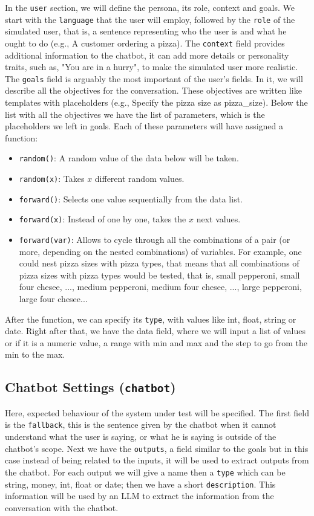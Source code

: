 In the \texttt{user} section, we will define
the persona, its role, context and goals.
We start with the \texttt{language} that the user will employ,
followed by the \texttt{role} of the simulated user,
that is, a sentence representing who the user is
and what he ought to do (e.g., A customer ordering a pizza).
The \texttt{context} field provides additional information to the chatbot,
it can add more details or personality traits, such as,
"You are in a hurry", to make the simulated user more realistic.
The \texttt{goals} field is arguably the most important of the user's fields.
In it, we will describe all the objectives for the conversation.
These objectives are written like templates with placeholders
(e.g., Specify the pizza size as {{pizza\_size}}).
Below the list with all the objectives
we have the list of parameters, which is the placeholders we left in goals.
Each of these parameters will have assigned a function:
\begin{itemize}
  \item \texttt{random()}: A random value of the data below will be taken.
  \item \texttt{random(x)}: Takes $x$ different random values.
  \item \texttt{forward()}: Selects one value sequentially from the data list.
  \item \texttt{forward(x)}: Instead of one by one, takes the $x$ next values.
  \item \texttt{forward(var)}:
    Allows to cycle through all the combinations of a pair (or more, depending on the nested combinations) of variables.
    For example, one could nest pizza sizes with pizza types,
    that means that all combinations of pizza sizes with pizza types would be tested,
    that is, small pepperoni, small four chesee, ..., medium pepperoni, medium four chesee, ..., large pepperoni, large four chesee...
\end{itemize}
After the function, we can specify its \texttt{type},
with values like int, float, string or date.
Right after that, we have the data field,
where we will input a list of values
or if it is a numeric value, a range with min and max
and the step to go from the min to the max.

\subsection{Chatbot Settings (\texttt{chatbot})}

Here, expected behaviour of the system under test will be specified.
The first field is the \texttt{fallback},
this is the sentence given by the chatbot when it cannot understand what the user is saying,
or what he is saying is outside of the chatbot's scope.
Next we have the \texttt{outputs}, a field similar to the goals
but in this case instead of being related to the inputs,
it will be used to extract outputs from the chatbot.
For each output we will give a name
then a \texttt{type} which can be string, money, int, float or date;
then we have a short \texttt{description}.
This information will be used by an \ac{LLM}
to extract the information from the conversation with the chatbot.


